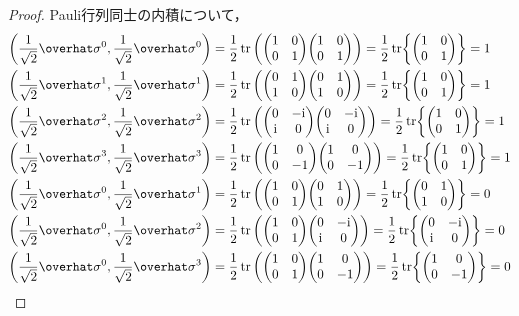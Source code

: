 \documentclass{report}
\begin{document}
    \begin{proof}
      Pauli行列同士の内積について，
      \begin{align}
        \qty(\frac{1}{\sqrt{2}}\hat{\sigma}^0, \frac{1}{\sqrt{2}}\hat{\sigma}^0) &= \frac{1}{2}\tr\qty(\mqty(1 & 0 \\ 0 & 1)\mqty(1 & 0 \\ 0 & 1)) = \frac{1}{2}\tr{\mqty(1 & 0 \\ 0 & 1)} = 1 \\ 
        \qty(\frac{1}{\sqrt{2}}\hat{\sigma}^1, \frac{1}{\sqrt{2}}\hat{\sigma}^1) &= \frac{1}{2}\tr\qty(\mqty(0 & 1 \\ 1 & 0)\mqty(0 & 1 \\ 1 & 0)) = \frac{1}{2}\tr{\mqty(1 & 0 \\ 0 & 1)} = 1 \\ 
        \qty(\frac{1}{\sqrt{2}}\hat{\sigma}^2, \frac{1}{\sqrt{2}}\hat{\sigma}^2) &= \frac{1}{2}\tr\qty(\mqty(0 & -\i \\ \i & 0)\mqty(0 & -\i \\ \i & 0)) = \frac{1}{2}\tr{\mqty(1 & 0 \\ 0 & 1)} = 1 \\ 
        \qty(\frac{1}{\sqrt{2}}\hat{\sigma}^3, \frac{1}{\sqrt{2}}\hat{\sigma}^3) &= \frac{1}{2}\tr\qty(\mqty(1 & 0 \\ 0 & -1)\mqty(1 & 0 \\ 0 & -1)) = \frac{1}{2}\tr{\mqty(1 & 0 \\ 0 & 1)} = 1 \\ 
        \qty(\frac{1}{\sqrt{2}}\hat{\sigma}^0, \frac{1}{\sqrt{2}}\hat{\sigma}^1) &= \frac{1}{2}\tr\qty(\mqty(1 & 0 \\ 0 & 1)\mqty(0 & 1 \\ 1 & 0)) = \frac{1}{2}\tr{\mqty(0 & 1 \\ 1 & 0)} = 0 \\ 
        \qty(\frac{1}{\sqrt{2}}\hat{\sigma}^0, \frac{1}{\sqrt{2}}\hat{\sigma}^2) &= \frac{1}{2}\tr\qty(\mqty(1 & 0 \\ 0 & 1)\mqty(0 & -\i \\ \i & 0)) = \frac{1}{2}\tr{\mqty(0 & -\i \\ \i & 0)} = 0 \\ 
        \qty(\frac{1}{\sqrt{2}}\hat{\sigma}^0, \frac{1}{\sqrt{2}}\hat{\sigma}^3) &= \frac{1}{2}\tr\qty(\mqty(1 & 0 \\ 0 & 1)\mqty(1 & 0 \\ 0 & -1)) = \frac{1}{2}\tr{\mqty(1 & 0 \\ 0 & -1)} = 0 \\

\end{align}
\end{proof}
\end{document}

